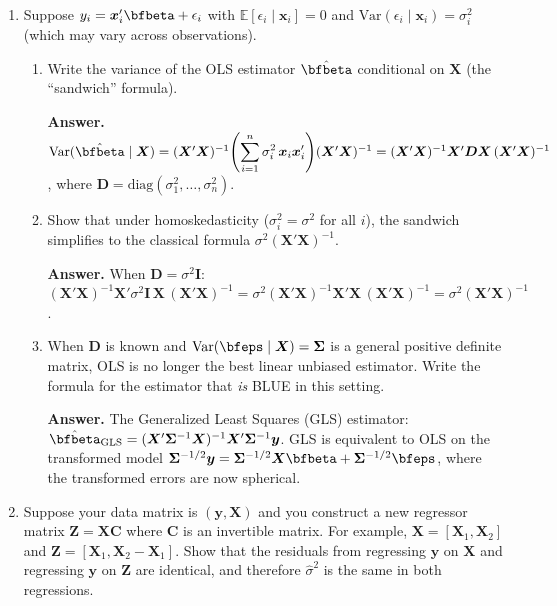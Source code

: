 \documentclass{article}
\begin{document}
\begin{enumerate}
\item Suppose $y_i = \bm{x}_i'\bfbeta + \epsilon_i$ with $\mathbb{E}[\epsilon_i \mid \bm{x}_i] = 0$ and $\text{Var}(\epsilon_i \mid \bm{x}_i) = \sigma_i^2$ (which may vary across observations).

\begin{enumerate}
  \item Write the variance of the OLS estimator $\hat{\bfbeta}$ conditional on $\bm{X}$ (the ``sandwich'' formula).

  \textbf{Answer.}
  $\text{Var}(\hat{\bfbeta} \mid \bm{X}) = (\bm{X}'\bm{X})^{-1}\!\left(\displaystyle\sum_{i=1}^n \sigma_i^2\,\bm{x}_i\bm{x}_i'\right)\!(\bm{X}'\bm{X})^{-1} = (\bm{X}'\bm{X})^{-1}\bm{X}'\bm{D}\bm{X}\,(\bm{X}'\bm{X})^{-1}$,
  where $\bm{D} = \text{diag}(\sigma_1^2, \ldots, \sigma_n^2)$.

  \item Show that under homoskedasticity ($\sigma_i^2 = \sigma^2$ for all $i$), the sandwich simplifies to the classical formula $\sigma^2(\bm{X}'\bm{X})^{-1}$.

  \textbf{Answer.} When $\bm{D} = \sigma^2\bm{I}$:
  $(\bm{X}'\bm{X})^{-1}\bm{X}'\sigma^2\bm{I}\,\bm{X}\,(\bm{X}'\bm{X})^{-1} = \sigma^2(\bm{X}'\bm{X})^{-1}\bm{X}'\bm{X}\,(\bm{X}'\bm{X})^{-1} = \sigma^2(\bm{X}'\bm{X})^{-1}$.

  \item When $\bm{D}$ is known and $\text{Var}(\bfeps \mid \bm{X}) = \bm{\Sigma}$ is a general positive definite matrix, OLS is no longer the best linear unbiased estimator.  Write the formula for the estimator that \emph{is} BLUE in this setting.

  \textbf{Answer.} The Generalized Least Squares (GLS) estimator:
  $\hat{\bfbeta}_{\text{GLS}} = (\bm{X}'\bm{\Sigma}^{-1}\bm{X})^{-1}\bm{X}'\bm{\Sigma}^{-1}\bm{y}$.
  GLS is equivalent to OLS on the transformed model $\bm{\Sigma}^{-1/2}\bm{y} = \bm{\Sigma}^{-1/2}\bm{X}\bfbeta + \bm{\Sigma}^{-1/2}\bfeps$, where the transformed errors are now spherical.
\end{enumerate}

\item Suppose your data matrix is $(\bm{y},\bm{X})$ and you construct a new regressor matrix $\bm{Z} = \bm{X}\bm{C}$ where $\bm{C}$ is an invertible matrix.  For example, $\bm{X} = [\bm{X}_1, \bm{X}_2]$ and $\bm{Z} = [\bm{X}_1, \bm{X}_2 - \bm{X}_1]$.  Show that the residuals from regressing $\bm{y}$ on $\bm{X}$ and regressing $\bm{y}$ on $\bm{Z}$ are identical, and therefore $\hat\sigma^2$ is the same in both regressions.


\end{enumerate}
\end{document}
